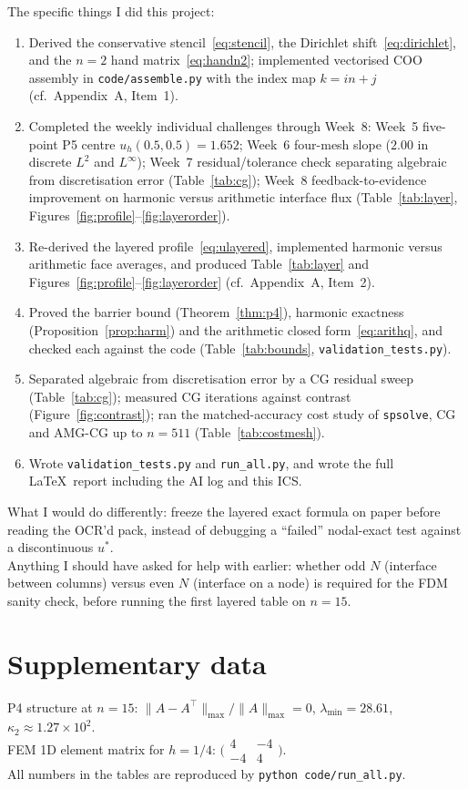 \documentclass[11pt,a4paper]{article}
\begin{document}
The specific things I did this project:
\begin{enumerate}[leftmargin=1.2em]
  \item Derived the conservative stencil~\eqref{eq:stencil}, the Dirichlet shift~\eqref{eq:dirichlet}, and the \(n=2\) hand matrix~\eqref{eq:handn2}; implemented vectorised COO assembly in \texttt{code/assemble.py} with the index map \(k=in+j\) (cf.\ Appendix~A, Item~1).
  \item Completed the weekly individual challenges through Week~8: Week~5 five-point P5 centre \(u_h(0.5,0.5)=1.652\); Week~6 four-mesh slope (\(2.00\) in discrete \(L^2\) and \(L^\infty\)); Week~7 residual/tolerance check separating algebraic from discretisation error (Table~\ref{tab:cg}); Week~8 feedback-to-evidence improvement on harmonic versus arithmetic interface flux (Table~\ref{tab:layer}, Figures~\ref{fig:profile}--\ref{fig:layerorder}).
  \item Re-derived the layered profile~\eqref{eq:ulayered}, implemented harmonic versus arithmetic face averages, and produced Table~\ref{tab:layer} and Figures~\ref{fig:profile}--\ref{fig:layerorder} (cf.\ Appendix~A, Item~2).
  \item Proved the barrier bound (Theorem~\ref{thm:p4}), harmonic exactness (Proposition~\ref{prop:harm}) and the arithmetic closed form~\eqref{eq:arithq}, and checked each against the code (Table~\ref{tab:bounds}, \texttt{validation\_tests.py}).
  \item Separated algebraic from discretisation error by a CG residual sweep (Table~\ref{tab:cg}); measured CG iterations against contrast (Figure~\ref{fig:contrast}); ran the matched-accuracy cost study of \texttt{spsolve}, CG and AMG-CG up to \(n=511\) (Table~\ref{tab:costmesh}).
  \item Wrote \texttt{validation\_tests.py} and \texttt{run\_all.py}, and wrote the full \LaTeX\ report including the AI log and this ICS.
\end{enumerate}
What I would do differently: freeze the layered exact formula on paper before reading the OCR'd pack, instead of debugging a ``failed'' nodal-exact test against a discontinuous \(u^*\).\\
Anything I should have asked for help with earlier: whether odd \(N\) (interface between columns) versus even \(N\) (interface on a node) is required for the FDM sanity check, before running the first layered table on \(n=15\).

\section{Supplementary data}
P4 structure at \(n=15\): \(\|A-A^\top\|_{\max}/\|A\|_{\max}=0\), \(\lambda_{\min}=28.61\), \(\kappa_2\approx 1.27\times 10^{2}\).\\
FEM 1D element matrix for \(h=1/4\): \(\bigl(\begin{smallmatrix}4&-4\\-4&4\end{smallmatrix}\bigr)\).\\
All numbers in the tables are reproduced by \texttt{python code/run\_all.py}.
\end{document}
